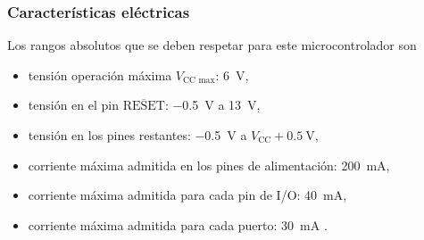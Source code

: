 \subsubsection{Características eléctricas}
Los rangos absolutos que se deben respetar para este microcontrolador son
\begin{itemize}
    \item tensión operación máxima $V_\text{CC max}$: \SI{6}{\volt},
    \item tensión en el pin $\overline{\text{RESET}}$: \SI{-0.5}{\volt} a \SI{13}{\volt},
    \item tensión en los pines restantes: \SI{-0.5}{\volt} a $V_\text{CC} + \SI{0.5}{\volt}$,
    \item corriente máxima admitida en los pines de alimentación: \SI{200}{\milli\ampere},
    \item corriente máxima admitida para cada pin de I/O: \SI{40}{\milli\ampere},
    \item corriente máxima admitida para cada puerto: \SI{30}{\milli\ampere} \cite{datasheet, atmega}.

\end{itemize}
